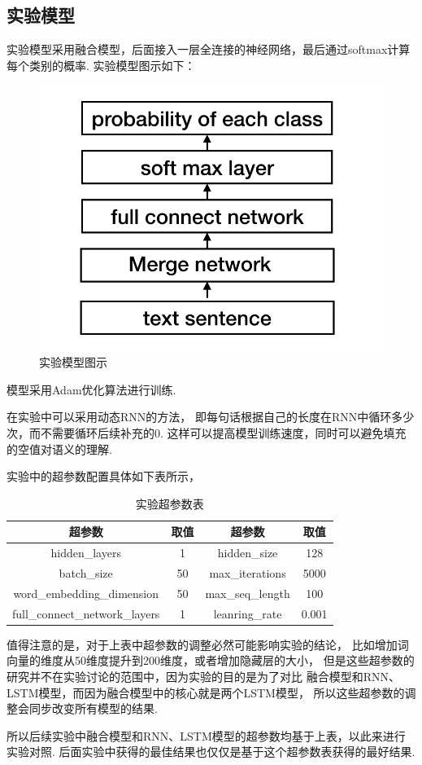 \documentclass[bachelor,winfonts]{jnuthesis}
\begin{document}
\subsection{实验模型}
实验模型采用融合模型，后面接入一层全连接的神经网络，最后通过softmax计算每个类别的概率.
实验模型图示如下：
\begin{figure}[h!]
  \centering
  \includegraphics[width=0.4\linewidth]{分类模型.png}
  \caption{实验模型图示}
\end{figure}

模型采用Adam优化算法\cite{Kingma2014Adam}进行训练.

在实验中可以采用动态RNN的方法，
即每句话根据自己的长度在RNN中循环多少次，而不需要循环后续补充的0.
这样可以提高模型训练速度，同时可以避免填充的空值对语义的理解.

实验中的超参数配置具体如下表所示，

\begin{table}[h!]
  \centering
  \begin{tabular}{cccc}
    \toprule
    \textbf{超参数} & \textbf{取值} & \textbf{超参数} & \textbf{取值}  \\
    \midrule
    hidden\_layers & 1 & hidden\_size & 128 \\
    batch\_size &  50 & max\_iterations & 5000 \\
    word\_embedding\_dimension & 50 & max\_seq\_length & 100 \\
    full\_connect\_network\_layers & 1 & leanring\_rate & 0.001 \\
    \bottomrule
  \end{tabular}
  \caption{实验超参数表}
\end{table}

值得注意的是，对于上表中超参数的调整必然可能影响实验的结论，
比如增加词向量的维度从50维度提升到200维度，或者增加隐藏层的大小，
但是这些超参数的研究并不在实验讨论的范围中，因为实验的目的是为了对比
融合模型和RNN、LSTM模型，而因为融合模型中的核心就是两个LSTM模型，
所以这些超参数的调整会同步改变所有模型的结果.

所以后续实验中融合模型和RNN、LSTM模型的超参数均基于上表，以此来进行实验对照.
后面实验中获得的最佳结果也仅仅是基于这个超参数表获得的最好结果.
\end{document}
